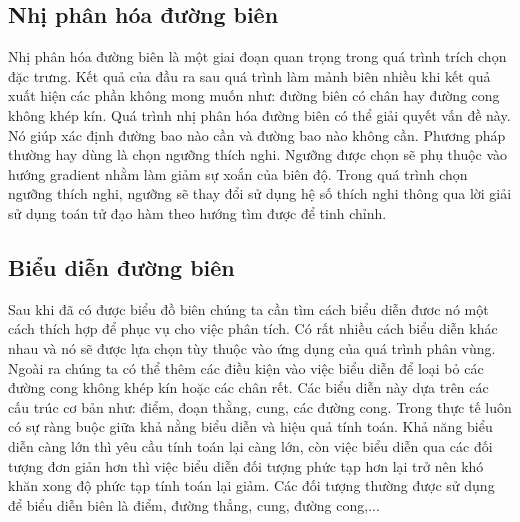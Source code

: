 \documentclass[12pt,oneside,a4]{report}
\begin{document}
\subsection{Nhị phân hóa đường biên}
Nhị phân hóa đường biên là một giai đoạn quan trọng trong quá trình trích chọn đặc trưng. Kết quả của đầu ra sau quá trình làm mảnh biên nhiều khi kết quả xuất hiện các phần không mong muốn như: đường biên có chân hay đường cong không khép kín. Quá trình nhị phân hóa đường biên có thể giải quyết vấn đề này. Nó giúp xác định đường bao nào cần và đường bao nào không cần. Phương pháp thường hay dùng là chọn ngưỡng thích nghi. Ngưỡng được chọn sẽ phụ thuộc vào  hướng gradient nhằm làm giảm sự xoắn của biên độ. Trong quá trình chọn ngưỡng thích nghi, ngưỡng sẽ thay đổi sử dụng   hệ số thích nghi thông qua lời giải sử dụng toán tử đạo hàm theo hướng tìm được để tinh chỉnh. 
\subsection{Biểu diễn đường biên}
Sau khi đã có được biểu đồ biên chúng ta cần tìm cách biểu diễn đươc nó một cách thích hợp để phục vụ cho việc phân tích. Có rất nhiều cách biểu diễn khác nhau và nó sẽ được lựa chọn  tùy thuộc vào ứng dụng của quá trình phân vùng. Ngoài ra chúng ta có thể thêm các điều kiện vào việc biểu diễn để loại bỏ các đường cong không khép kín hoặc các chân rết.  Các biểu diễn này dựa trên các cấu trúc cơ bản như: điểm, đoạn thằng, cung, các đường cong. Trong thực tế luôn có sự ràng buộc giữa khả nằng biểu diễn và hiệu quả tính toán. Khả năng biểu diễn càng lớn thì yêu cầu tính toán lại càng lớn, còn việc biểu diễn qua các đối tượng đơn giản hơn thì việc biểu diễn đối tượng phức tạp hơn lại trở nên khó khăn xong độ phức tạp tính toán lại giảm. Các đối tượng thường được sử dụng để biểu diễn biên là điểm, đường thẳng, cung, đường cong,...
\end{document}
